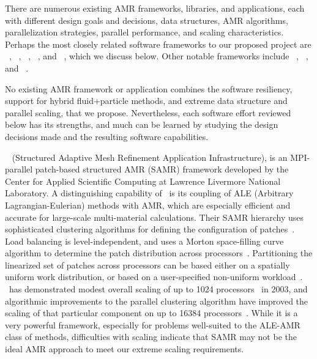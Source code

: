 \documentclass[11pt,letterpaper]{article}
\begin{document}
There are numerous existing AMR frameworks, libraries, and applications, each
with different design goals and decisions, data structures, AMR
algorithms, parallelization strategies, parallel
performance, and scaling characteristics.  Perhaps the most closely
related software frameworks to our proposed project are
\samrai~\cite{wwwsamraicode,WiHo01},
\chombo~\cite{wwwchombo,CoGr09},
\paramesh~\cite{wwwparamesh,MaOl00,Ol06,OlMa05},
\alps~\cite{BuBu09}, and 
\gadget~\cite{Sp05,wwwgadget}, which
we discuss below.  Other notable frameworks include
\clawpack~\cite{wwwclawpack}, \grace~\cite{PaLi10}, and
\carpet~\cite{wwwcarpet,ScDi06}.  

No existing AMR framework or application combines the software
resiliency, support for hybrid fluid+particle methods, and extreme
data structure and parallel scaling, that
we propose.  Nevertheless,
each software effort reviewed below has its strengths, and much
can be learned by studying the design decisions made and the resulting
software capabilities.


\SUBSUBSECTION{\samrai}
%
\samrai~\cite{wwwsamraicode,WiHo01} (Structured Adaptive Mesh
Refinement Application Infrastructure), is an MPI-parallel patch-based
structured AMR (SAMR) framework developed by the Center for Applied
Scientific Computing at Lawrence Livermore National Laboratory.  A
distinguishing capability of \samrai\ is its coupling of ALE
(Arbitrary Lagrangian-Eulerian) methods with AMR, which are especially
efficient and accurate for large-scale multi-material calculations.
Their SAMR hierarchy uses sophisticated clustering algorithms for
defining the configuration of patches~\cite{GuWi06}.  Load balancing
is level-independent, and uses a Morton space-filling curve algorithm
to determine the patch distribution across processors~\cite{WiHo01}.
Partitioning the linearized set of patches across processors can be
based either on a spatially uniform work distribution, or based on a
user-specified non-uniform workload~\cite{wwwsamraicode}.  \samrai\
has demonstrated modest overall scaling of up to 1024
processors~\cite{WiHy03} in 2003, and algorithmic improvements to the
parallel clustering algorithm have improved the scaling of that
particular component on up to 16384 processors~\cite{GuWi06}.  While
it is a very powerful framework, especially for problems well-suited
to the ALE-AMR class of methods, difficulties with scaling indicate that
SAMR may not be the ideal AMR approach to meet our
extreme scaling requirements.
\end{document}
